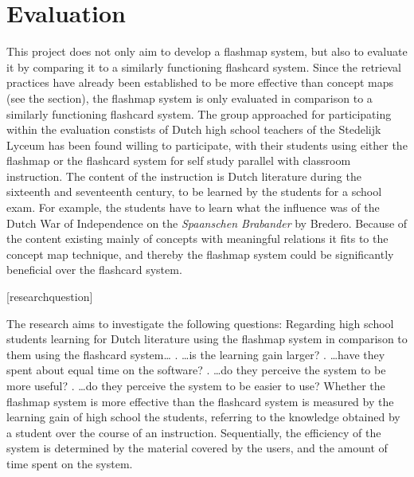 \section{Evaluation}

\label{sec:intro_evaluation}

This project does not only aim to develop a flashmap system, but also to evaluate it by comparing it to a similarly functioning flashcard system. Since the retrieval practices have already been established to be more effective than concept maps (see the  section), the flashmap system is only evaluated in comparison to a similarly functioning flashcard system. The group approached for participating within the evaluation constists of Dutch high school teachers of the Stedelijk Lyceum has been found willing to participate, with their students using either the flashmap or the flashcard system for self study parallel with classroom instruction. The content of the instruction is Dutch literature during the sixteenth and seventeenth century, to be learned by the students for a school exam. For example, the students have to learn what the influence was of the Dutch War of Independence on the \emph{Spaanschen Brabander} by Bredero. Because of the content existing mainly of concepts with meaningful relations it fits to the concept map technique, and thereby the flashmap system could be significantly beneficial over the flashcard system.

\renewcommand{\theresearchquestion}{\Roman{researchquestion}}
[researchquestion]
\renewcommand{\thesubquestion}{\alph{subquestion}}

The research aims to investigate the following questions: Regarding high school students learning for Dutch literature using the flashmap system in comparison to them using the flashcard system\ldots
%
\label{benefit}
\label{effectiveness}
. \ldots is the learning gain larger?
%
\label{efficiency}
. \ldots have they spent about equal time on the software?
%
\label{perception}
\label{usefulness}
. \ldots do they perceive the system to be more useful?
%
\label{ease}
. \ldots do they perceive the system to be easier to use?
%
Whether the flashmap system is more effective than the flashcard system is measured by the learning gain of high school the students, referring to the knowledge obtained by a student over the course of an instruction. Sequentially, the efficiency of the system is determined by the material covered by the users, and the amount of time spent on the system.

